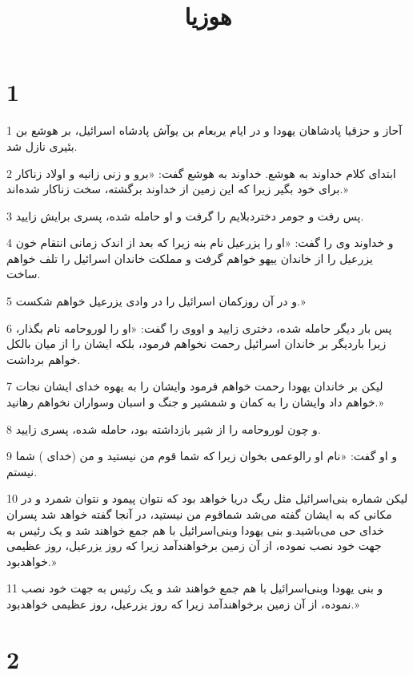 

\title{هوزيا}


\chapter{1}

\par 1 آحاز و حزقیا پادشاهان یهودا و در ایام یربعام بن یوآش پادشاه اسرائیل، بر هوشع بن بئیری نازل شد.
\par 2 ابتدای کلام خداوند به هوشع. خداوند به هوشع گفت: «برو و زنی زانیه و اولاد زناکار برای خود بگیر زیرا که این زمین از خداوند برگشته، سخت زناکار شده‌اند.»
\par 3 پس رفت و جومر دختردبلایم را گرفت و او حامله شده، پسری برایش زایید.
\par 4 و خداوند وی را گفت: «او را یزرعیل نام بنه زیرا که بعد از اندک زمانی انتقام خون یزرعیل را از خاندان ییهو خواهم گرفت و مملکت خاندان اسرائیل را تلف خواهم ساخت.
\par 5 و در آن روزکمان اسرائیل را در وادی یزرعیل خواهم شکست.»
\par 6 پس بار دیگر حامله شده، دختری زایید و اووی را گفت: «او را لوروحامه نام بگذار، زیرا باردیگر بر خاندان اسرائیل رحمت نخواهم فرمود، بلکه ایشان را از میان بالکل خواهم برداشت.
\par 7 لیکن بر خاندان یهودا رحمت خواهم فرمود وایشان را به یهوه خدای ایشان نجات خواهم داد وایشان را به کمان و شمشیر و جنگ و اسبان وسواران نخواهم رهانید.»
\par 8 و چون لوروحامه را از شیر بازداشته بود، حامله شده، پسری زایید.
\par 9 و او گفت: «نام او رالوعمی بخوان زیرا که شما قوم من نیستید و من (خدای ) شما نیستم.
\par 10 لیکن شماره بنی‌اسرائیل مثل ریگ دریا خواهد بود که نتوان پیمود و نتوان شمرد و در مکانی که به ایشان گفته می‌شد شماقوم من نیستید، در آنجا گفته خواهد شد پسران خدای حی می‌باشید.و بنی یهودا وبنی‌اسرائیل با هم جمع خواهند شد و یک رئیس به جهت خود نصب نموده، از آن زمین برخواهندآمد زیرا که روز یزرعیل، روز عظیمی خواهدبود.»
\par 11 و بنی یهودا وبنی‌اسرائیل با هم جمع خواهند شد و یک رئیس به جهت خود نصب نموده، از آن زمین برخواهندآمد زیرا که روز یزرعیل، روز عظیمی خواهدبود.»

\chapter{2}

